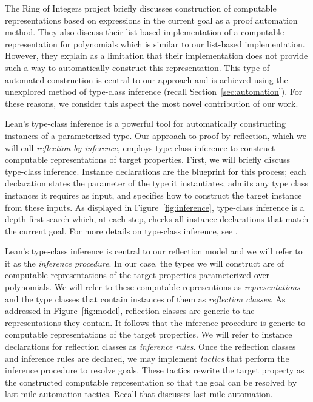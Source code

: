 The Ring of Integers project \cite{RingOfIntegers2025} briefly discusses construction of computable representations based on expressions in the current goal as a proof automation method. They also discuss their list-based implementation of a computable representation for polynomials which is similar to our list-based implementation. However, they explain as a limitation that their implementation does not provide such a way to automatically construct this representation. This type of automated construction is central to our approach and is achieved using the unexplored method of type-class inference (recall Section~\ref{sec:automation}). For these reasons, we consider this aspect the most novel contribution of our work.

\label{sec:reflection}


Lean's type-class inference is a powerful tool for automatically constructing instances of a parameterized type. Our approach to proof-by-reflection, which we will call \emph{reflection by inference}, employs type-class inference to construct computable representations of target properties. First, we will briefly discuss type-class inference. Instance declarations are the blueprint for this process; each declaration states the parameter of the type it instantiates, admits any type class instances it requires as input, and specifies how to construct the target instance from these inputs. As displayed in Figure~\ref{fig:inference}, type-class inference is a depth-first search which, at each step, checks all instance declarations that match the current goal. For more details on type-class inference, see \cite{TypeClasses}.

Lean's type-class inference is central to our reflection model and we will refer to it as the \emph{inference procedure}. In our case, the types we will construct are of computable representations of the target properties parameterized over polynomials. We will refer to these computable representions as \emph{representations} and the type classes that contain instances of them as \emph{reflection classes}. As addressed in Figure~\ref{fig:model}, reflection classes are generic to the representations they contain. It follows that the inference procedure is generic to computable representations of the target properties. We will refer to instance declarations for reflection classes as \emph{inference rules}. Once the reflection classes and inference rules are declared, we may implement \emph{tactics} that perform the inference procedure to resolve goals. These tactics rewrite the target property as the constructed computable representation so that the goal can be resolved by last-mile automation tactics. Recall that \cite{SmallScaleReflection2024} discusses last-mile automation.

